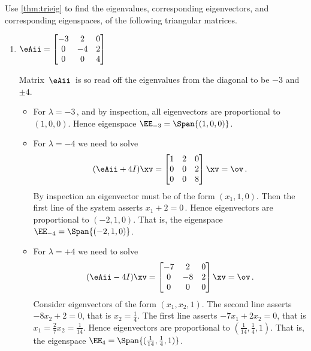\begin{example} \label{eg:trieig}
Use \cref{thm:trieig} to find the eigenvalues, corresponding eigenvectors, and corresponding eigenspaces, of the following triangular matrices.
\begin{enumerate}
\item \(\eAii=\begin{bmatrix}-3&2&0
\\0&-4&2
\\0&0&4\end{bmatrix}\)
\begin{solution} 
Matrix~\(\eAii\)\ is  so read off the eigenvalues from the diagonal to be \(-3\) and~\(\pm 4\).
\begin{itemize}
\item For \(\lambda=-3\)\,, and by inspection, all eigenvectors are proportional to \((1,0,0)\).
Hence eigenspace \(\EE_{-3}=\Span\{(1,0,0)\}\).
\item For \(\lambda=-4\) we need to solve
\begin{equation*}
(\eAii+4I)\xv=
\begin{bmatrix}1&2&0
\\0&0&2
\\0&0&8\end{bmatrix}\xv=\ov\,.
\end{equation*}
By inspection an eigenvector must be of the form \((x_1,1,0)\).
Then the first line of the system asserts \(x_1+2=0\)\,.
Hence eigenvectors are proportional to \((-2,1,0)\).
That is, the eigenspace \(\EE_{-4}=\Span\{(-2,1,0)\}\).
\item For \(\lambda=+4\) we need to solve
\begin{equation*}
(\eAii-4I)\xv=
\begin{bmatrix}-7&2&0
\\0&-8&2
\\0&0&0\end{bmatrix}\xv=\ov\,.
\end{equation*}
Consider eigenvectors of the form \((x_1,x_2,1)\).
The second line asserts \(-8x_2+2=0\), that is \(x_2=\frac14\).
The first line asserts \(-7x_1+2x_2=0\), that is \(x_1=\frac27x_2=\frac1{14}\).
Hence eigenvectors are proportional to \((\frac1{14},\frac14,1)\).
That is, the eigenspace \(\EE_{4}=\Span\{(\frac1{14},\frac14,1)\}\).
\end{itemize}
\end{solution}



\end{enumerate}
\end{example}
